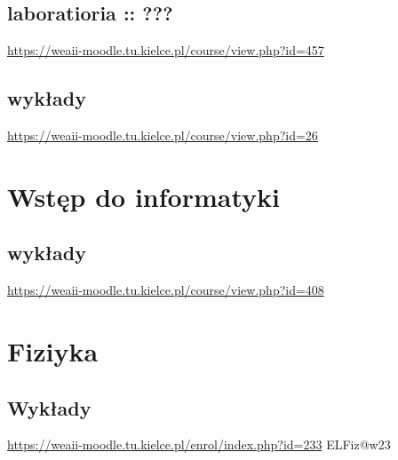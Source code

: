 \documentclass[11pt]{article}
\begin{document}
\subsection{laboratioria :: ???}
\label{sec:orgf9bb6bd}
\url{https://weaii-moodle.tu.kielce.pl/course/view.php?id=457}
\subsection{wykłady}
\label{sec:org46192d2}
\url{https://weaii-moodle.tu.kielce.pl/course/view.php?id=26}
\section{Wstęp do informatyki}
\label{sec:orgafebde9}
\subsection{wykłady}
\label{sec:org8282844}
\url{https://weaii-moodle.tu.kielce.pl/course/view.php?id=408}
\section{Fiziyka}
\label{sec:org1f5c60d}
\subsection{Wykłady}
\label{sec:orgd36312a}
\url{https://weaii-moodle.tu.kielce.pl/enrol/index.php?id=233} ELFiz@w23
\end{document}
